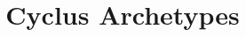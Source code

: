 \documentclass{ntmanuscript}
\title{Cyclus Archetypes}
\date{}
\begin{document}






\cite{scopatz_pyne}



\end{document}
